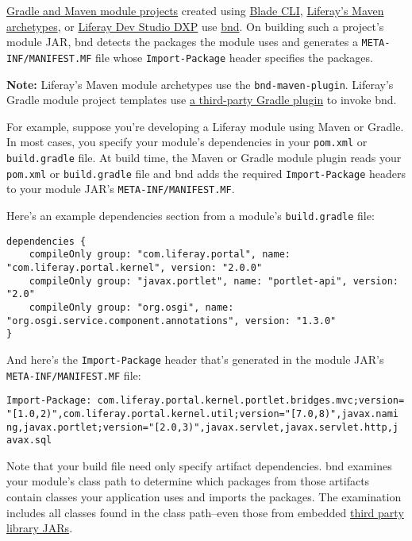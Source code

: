\href{/docs/7-2/reference/-/knowledge_base/r/project-templates}{Gradle
and Maven module projects} created using
\href{/docs/7-2/reference/-/knowledge_base/r/blade-cli}{Blade CLI},
\href{/docs/7-2/reference/-/knowledge_base/r/maven}{Liferay's Maven
archetypes}, or
\href{/docs/7-2/reference/-/knowledge_base/r/liferay-dev-studio}{Liferay
Dev Studio DXP} use \href{http://bnd.bndtools.org/}{bnd}. On building
such a project's module JAR, bnd detects the packages the module uses
and generates a \texttt{META-INF/MANIFEST.MF} file whose
\texttt{Import-Package} header specifies the packages.

\noindent\hrulefill

\textbf{Note:} Liferay's Maven module archetypes use the
\texttt{bnd-maven-plugin}. Liferay's Gradle module project templates use
\href{https://github.com/TomDmitriev/gradle-bundle-plugin}{a third-party
Gradle plugin} to invoke bnd.

\noindent\hrulefill

For example, suppose you're developing a Liferay module using Maven or
Gradle. In most cases, you specify your module's dependencies in your
\texttt{pom.xml} or \texttt{build.gradle} file. At build time, the Maven
or Gradle module plugin reads your \texttt{pom.xml} or
\texttt{build.gradle} file and bnd adds the required
\texttt{Import-Package} headers to your module JAR's
\texttt{META-INF/MANIFEST.MF}.

Here's an example dependencies section from a module's
\texttt{build.gradle} file:

\begin{verbatim}
dependencies {
    compileOnly group: "com.liferay.portal", name: "com.liferay.portal.kernel", version: "2.0.0"
    compileOnly group: "javax.portlet", name: "portlet-api", version: "2.0"
    compileOnly group: "org.osgi", name: "org.osgi.service.component.annotations", version: "1.3.0"
}
\end{verbatim}

And here's the \texttt{Import-Package} header that's generated in the
module JAR's \texttt{META-INF/MANIFEST.MF} file:

\begin{verbatim}
Import-Package: com.liferay.portal.kernel.portlet.bridges.mvc;version=
"[1.0,2)",com.liferay.portal.kernel.util;version="[7.0,8)",javax.nami
ng,javax.portlet;version="[2.0,3)",javax.servlet,javax.servlet.http,j
avax.sql
\end{verbatim}

Note that your build file need only specify artifact dependencies. bnd
examines your module's class path to determine which packages from those
artifacts contain classes your application uses and imports the
packages. The examination includes all classes found in the class
path--even those from embedded
\href{/docs/7-2/customization/-/knowledge_base/c/adding-third-party-libraries-to-a-module}{third
party library JARs}.

